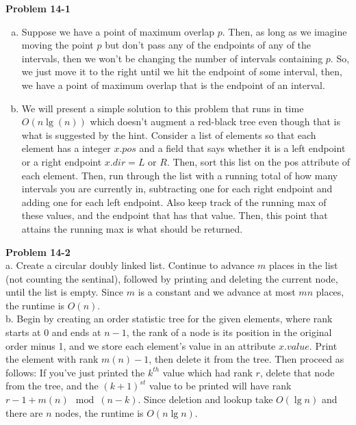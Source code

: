 \documentclass{article}
\begin{document}
\noindent\textbf{ Problem 14-1} \\

\begin{enumerate}[a.]
\item 
Suppose we have a point of maximum overlap $p$. Then, as long as we imagine moving the point $p$ but don't pass any of the endpoints of any of the intervals, then we won't be changing the number of intervals containing $p$. So, we just move it to the right until we hit the endpoint of some interval, then, we have a point of maximum overlap that is the endpoint of an interval.

\item
We will present a simple solution to this problem that runs in time $O(n\lg(n))$ which doesn't augment a red-black tree even though that is what is suggested by the hint. Consider a list of elements so that each element has a integer $x.pos$ and a field that says whether it is a left endpoint or a right endpoint $x.dir = L$ or $R$. Then, sort this list on the pos attribute of each element. Then, run through the list with a running total of how many intervals you are currently in, subtracting one for each right endpoint and adding one for each left endpoint. Also keep track of the running max of these values, and the endpoint that has that value. Then, this point that attains the running max is what should be returned.

\end{enumerate}

\noindent\textbf{Problem 14-2}\\

a. Create a circular doubly linked list.  Continue to advance $m$ places in the list (not  counting the sentinal), followed by printing and deleting the current node, until the list is empty. Since $m$ is a constant and we advance at most $mn$ places, the runtime is $O(n)$.\\

b. Begin by creating an order statistic tree for the given elements, where rank starts at 0 and ends at $n-1$, the rank of a node is its position in the original order minus 1, and we store each element's value in an attribute $x.value$.  Print the element with rank $m(n) - 1$, then delete it from the tree.  Then proceed as follows:  If you've just printed the $k^{th}$ value which had rank $r$, delete that node from the tree, and the $(k+1)^{st}$ value to be printed will have rank $r - 1 + m(n) \mod (n-k)$.  Since deletion and lookup take $O(\lg n)$ and there are $n$ nodes, the runtime is $O(n\lg n)$.
\end{document}
